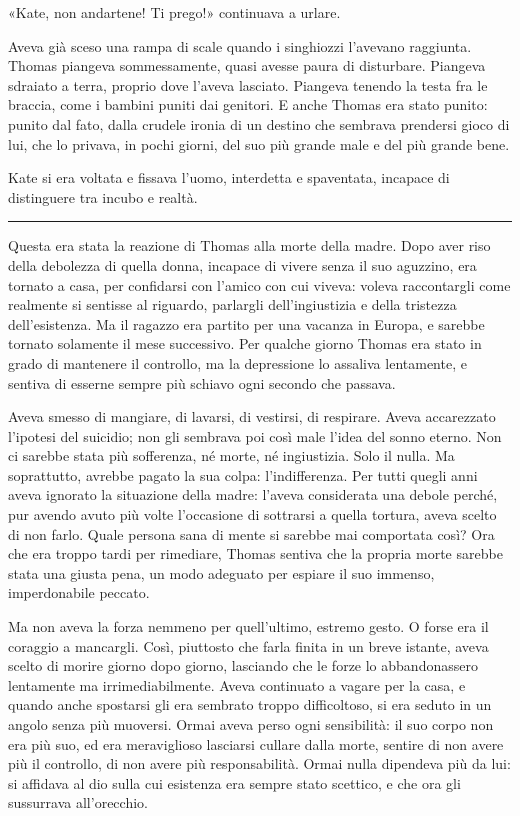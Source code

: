 \documentclass[a4paper,oneside,11pt]{memoir}
\begin{document}
«Kate, non andartene! Ti prego!» continuava a urlare.

Aveva già sceso una rampa di scale quando i singhiozzi l'avevano raggiunta. Thomas piangeva sommessamente, quasi avesse
paura di disturbare. Piangeva sdraiato a terra, proprio dove l'aveva lasciato. Piangeva tenendo la testa fra le braccia,
come i bambini puniti dai genitori. E anche Thomas era stato punito: punito dal fato, dalla crudele ironia di un destino
che sembrava prendersi gioco di lui, che lo privava, in pochi giorni, del suo più grande male e del più grande bene.

Kate si era voltata e fissava l'uomo, interdetta e spaventata, incapace di distinguere tra incubo e realtà.

\plainbreak{1}

Questa era stata la reazione di Thomas alla morte della madre. Dopo aver riso della debolezza di quella donna, incapace
di vivere senza il suo aguzzino, era tornato a casa, per confidarsi con l'amico con cui viveva: voleva raccontargli come
realmente si sentisse al riguardo, parlargli dell'ingiustizia e della tristezza dell'esistenza. Ma il ragazzo era
partito per una vacanza in Europa, e sarebbe tornato solamente il mese successivo. Per qualche giorno Thomas era stato
in grado di mantenere il controllo, ma la depressione lo assaliva lentamente, e sentiva di esserne sempre più schiavo
ogni secondo che passava.

Aveva smesso di mangiare, di lavarsi, di vestirsi, di respirare. Aveva accarezzato l'ipotesi del suicidio; non gli
sembrava poi così male l'idea del sonno eterno. Non ci sarebbe stata più sofferenza, né morte, né ingiustizia. Solo il
nulla. Ma soprattutto, avrebbe pagato la sua colpa: l'indifferenza. Per tutti quegli anni aveva ignorato la situazione
della madre: l'aveva considerata una debole perché, pur avendo avuto più volte l'occasione di sottrarsi a quella
tortura, aveva scelto di non farlo. Quale persona sana di mente si sarebbe mai comportata così? Ora che era troppo tardi
per rimediare, Thomas sentiva che la propria morte sarebbe stata una giusta pena, un modo adeguato per espiare il suo
immenso, imperdonabile peccato.

Ma non aveva la forza nemmeno per quell'ultimo, estremo gesto. O forse era il coraggio a mancargli. Così, piuttosto che
farla finita in un breve istante, aveva scelto di morire giorno dopo giorno, lasciando che le forze lo abbandonassero
lentamente ma irrimediabilmente. Aveva continuato a vagare per la casa, e quando anche spostarsi gli era sembrato troppo
difficoltoso, si era seduto in un angolo senza più muoversi. Ormai aveva perso ogni sensibilità: il suo corpo non era
più suo, ed era meraviglioso lasciarsi cullare dalla morte, sentire di non avere più il controllo, di non avere più
responsabilità. Ormai nulla dipendeva più da lui: si affidava al dio sulla cui esistenza era sempre stato scettico, e
che ora gli sussurrava all'orecchio.
\end{document}
